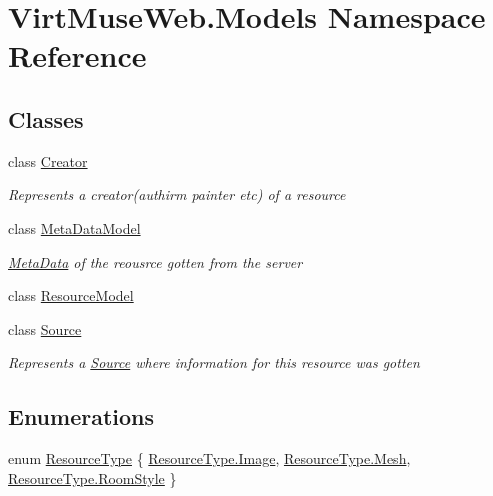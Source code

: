 \hypertarget{namespace_virt_muse_web_1_1_models}{}\section{Virt\+Muse\+Web.\+Models Namespace Reference}
\label{namespace_virt_muse_web_1_1_models}
\subsection*{Classes}
\begin{DoxyCompactItemize}
\item 
class \mbox{\hyperlink{class_virt_muse_web_1_1_models_1_1_creator}{Creator}}
\begin{DoxyCompactList}\small\item\em Represents a creator(authirm painter etc) of a resource \end{DoxyCompactList}\item 
class \mbox{\hyperlink{class_virt_muse_web_1_1_models_1_1_meta_data_model}{Meta\+Data\+Model}}
\begin{DoxyCompactList}\small\item\em \mbox{\hyperlink{class_meta_data}{Meta\+Data}} of the reousrce gotten from the server \end{DoxyCompactList}\item 
class \mbox{\hyperlink{class_virt_muse_web_1_1_models_1_1_resource_model}{Resource\+Model}}
\item 
class \mbox{\hyperlink{class_virt_muse_web_1_1_models_1_1_source}{Source}}
\begin{DoxyCompactList}\small\item\em Represents a \mbox{\hyperlink{class_virt_muse_web_1_1_models_1_1_source}{Source}} where information for this resource was gotten \end{DoxyCompactList}\end{DoxyCompactItemize}
\subsection*{Enumerations}
\begin{DoxyCompactItemize}
\item 
enum \mbox{\hyperlink{namespace_virt_muse_web_1_1_models_ab185d30c831a1ac813a53670c29d6397}{Resource\+Type}} \{ \mbox{\hyperlink{namespace_virt_muse_web_1_1_models_ab185d30c831a1ac813a53670c29d6397abe53a0541a6d36f6ecb879fa2c584b08}{Resource\+Type.\+Image}}, 
\mbox{\hyperlink{namespace_virt_muse_web_1_1_models_ab185d30c831a1ac813a53670c29d6397a710fdb6adb881b408116ef95335e1961}{Resource\+Type.\+Mesh}}, 
\mbox{\hyperlink{namespace_virt_muse_web_1_1_models_ab185d30c831a1ac813a53670c29d6397a29c586208e02ddb885b956f7abb5f57c}{Resource\+Type.\+Room\+Style}}
 \}
\end{DoxyCompactItemize}


